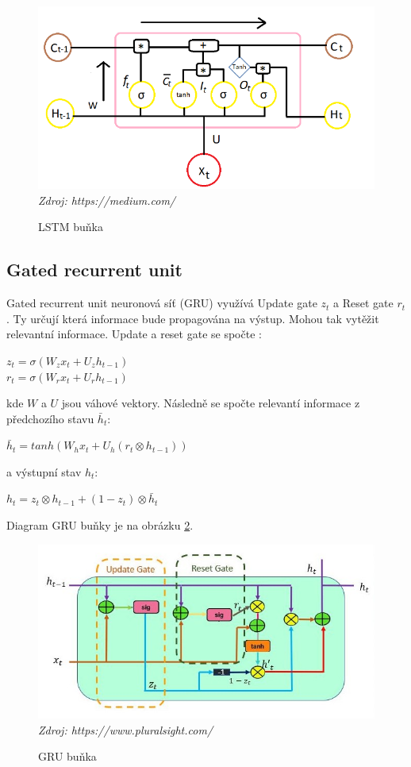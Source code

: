 \begin{figure}[H]
\caption{LSTM buňka}
\label{fig:lstm_cell}
\centering
\includegraphics[width=1\textwidth]{img/cho/lstm_cell.png}
\textit{Zdroj: https://medium.com/}
\end{figure}

\subsection{Gated recurrent unit}

Gated recurrent unit neuronová síť (GRU) využívá Update gate $z_{t}$ a Reset gate $r_{t}$. Ty určují která informace bude propagována na výstup. Mohou tak vytěžit relevantní informace. Update a reset gate se spočte \citep{cho.gru}:

$z_{t}=\sigma(W_{z}x_{t} + U_{z}h_{t-1})$\\\indent
$r_{t}=\sigma(W_{r}x_{t} + U_{r}h_{t-1})$

\noindent kde $W$ a $U$ jsou váhové vektory. Následně se spočte relevantí informace z předchozího stavu $\bar{h}_{t}$:

$\bar{h}_{t}=tanh(W_{h}x_{t} + U_{h}(r_{t} \otimes h_{t-1}))$

\noindent a výstupní stav $h_{t}$:

$h_{t}=z_{t} \otimes h_{t-1} + (1-z_{t}) \otimes \bar{h}_{t}$

Diagram GRU buňky je na obrázku \ref{fig:gru_cell}.

\begin{figure}[H]
\caption{GRU buňka}
\label{fig:gru_cell}
\centering
\includegraphics[width=1\textwidth]{img/cho/gru_cell.jpg}
\textit{Zdroj: https://www.pluralsight.com/}
\end{figure}

